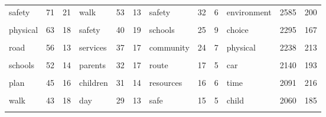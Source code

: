 \documentclass[]{elsarticle} %
\begin{document}
\begin{table}
{\begin{tabular}[t]{lcclcclcclcc}
\addlinespace
safety & 71 & 21 & walk & 53 & 13 & safety & 32 & 6 & environment & 2585 & 200\\
\cellcolor{gray!6}{health} & \cellcolor{gray!6}{65} & \cellcolor{gray!6}{21} & \cellcolor{gray!6}{weather} & \cellcolor{gray!6}{40} & \cellcolor{gray!6}{11} & \cellcolor{gray!6}{help} & \cellcolor{gray!6}{29} & \cellcolor{gray!6}{9} & \cellcolor{gray!6}{traffic} & \cellcolor{gray!6}{2334} & \cellcolor{gray!6}{206}\\
physical & 63 & 18 & safety & 40 & 19 & schools & 25 & 9 & choice & 2295 & 167\\
\cellcolor{gray!6}{traffic} & \cellcolor{gray!6}{59} & \cellcolor{gray!6}{20} & \cellcolor{gray!6}{safe} & \cellcolor{gray!6}{39} & \cellcolor{gray!6}{19} & \cellcolor{gray!6}{children} & \cellcolor{gray!6}{25} & \cellcolor{gray!6}{6} & \cellcolor{gray!6}{activity} & \cellcolor{gray!6}{2265} & \cellcolor{gray!6}{207}\\
road & 56 & 13 & services & 37 & 17 & community & 24 & 7 & physical & 2238 & 213\\
\addlinespace
\cellcolor{gray!6}{activity} & \cellcolor{gray!6}{55} & \cellcolor{gray!6}{14} & \cellcolor{gray!6}{planning} & \cellcolor{gray!6}{37} & \cellcolor{gray!6}{7} & \cellcolor{gray!6}{bus} & \cellcolor{gray!6}{18} & \cellcolor{gray!6}{4} & \cellcolor{gray!6}{trips} & \cellcolor{gray!6}{2164} & \cellcolor{gray!6}{168}\\
schools & 52 & 14 & parents & 32 & 17 & route & 17 & 5 & car & 2140 & 193\\
\cellcolor{gray!6}{children} & \cellcolor{gray!6}{47} & \cellcolor{gray!6}{15} & \cellcolor{gray!6}{sustainable} & \cellcolor{gray!6}{31} & \cellcolor{gray!6}{8} & \cellcolor{gray!6}{zone} & \cellcolor{gray!6}{16} & \cellcolor{gray!6}{6} & \cellcolor{gray!6}{safety} & \cellcolor{gray!6}{2111} & \cellcolor{gray!6}{202}\\
plan & 45 & 16 & children & 31 & 14 & resources & 16 & 6 & time & 2091 & 216\\
\cellcolor{gray!6}{students} & \cellcolor{gray!6}{44} & \cellcolor{gray!6}{14} & \cellcolor{gray!6}{child} & \cellcolor{gray!6}{31} & \cellcolor{gray!6}{12} & \cellcolor{gray!6}{day} & \cellcolor{gray!6}{16} & \cellcolor{gray!6}{4} & \cellcolor{gray!6}{factors} & \cellcolor{gray!6}{2083} & \cellcolor{gray!6}{214}\\
\addlinespace
walk & 43 & 18 & day & 29 & 13 & safe & 15 & 5 & child & 2060 & 185\\
\cellcolor{gray!6}{public} & \cellcolor{gray!6}{39} & \cellcolor{gray!6}{15} & \cellcolor{gray!6}{routes} & \cellcolor{gray!6}{28} & \cellcolor{gray!6}{14} & \cellcolor{gray!6}{planning} & \cellcolor{gray!6}{15} & \cellcolor{gray!6}{4} & \cellcolor{gray!6}{walk} & \cellcolor{gray!6}{1985} & \cellcolor{gray!6}{198}\\

\end{tabular}}
\end{table}
\end{document}
